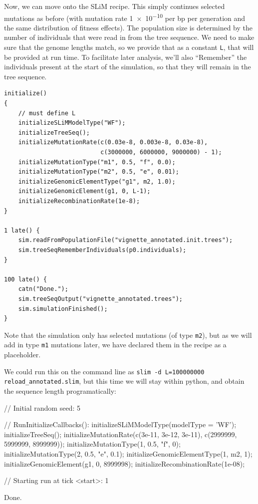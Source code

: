 \documentclass[12pt]{article}
\begin{document}
Now, we can move onto the SLiM recipe.
This simply continues selected mutations as before (with mutation rate \num{1e-10} per bp per generation and the same distribution of fitness effects).
The population size is determined by the number of individuals that were read in from the tree sequence.
We need to make sure that the genome lengths match, so we provide that as a constant \verb|L|, that will be provided at run time.
To facilitate later analysis, we’ll also “Remember” the individuals present at the start of the simulation,
so that they will remain in the tree sequence.
\begin{lstlisting}[language=slim]
initialize()
{
    // must define L
    initializeSLiMModelType("WF");
    initializeTreeSeq();
    initializeMutationRate(c(0.03e-8, 0.003e-8, 0.03e-8),
                           c(3000000, 6000000, 9000000) - 1);
    initializeMutationType("m1", 0.5, "f", 0.0);
    initializeMutationType("m2", 0.5, "e", 0.01);
    initializeGenomicElementType("g1", m2, 1.0);
    initializeGenomicElement(g1, 0, L-1);
    initializeRecombinationRate(1e-8);
}

1 late() { 
    sim.readFromPopulationFile("vignette_annotated.init.trees");
    sim.treeSeqRememberIndividuals(p0.individuals);
}

100 late() {
    catn("Done.");
    sim.treeSeqOutput("vignette_annotated.trees");
    sim.simulationFinished();
}

\end{lstlisting}

Note that the simulation only has selected mutations (of type \verb|m2|),
but as we will add in type \verb|m1| mutations later,
we have declared them in the recipe as a placeholder.

We could run this on the command line as \verb|slim -d L=100000000 reload_annotated.slim|,
but this time we will stay within python, and obtain the sequence length programatically:

\begin{pycon}
    // Initial random seed:
    5
    
    // RunInitializeCallbacks():
    initializeSLiMModelType(modelType = 'WF');
    initializeTreeSeq();
    initializeMutationRate(c(3e-11, 3e-12, 3e-11), c(2999999, 5999999, 8999999));
    initializeMutationType(1, 0.5, "f", 0);
    initializeMutationType(2, 0.5, "e", 0.1);
    initializeGenomicElementType(1, m2, 1);
    initializeGenomicElement(g1, 0, 8999998);
    initializeRecombinationRate(1e-08);
    
    // Starting run at tick <start>:
    1 
    
    Done.
\end{pycon}
\end{document}
